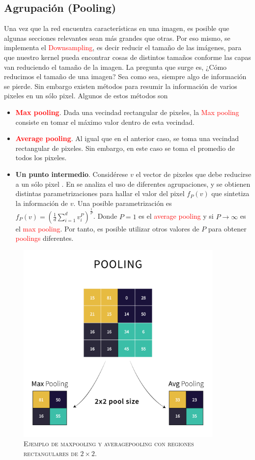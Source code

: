 \subsection{Agrupación (Pooling)}
Una vez que la red encuentra características en una imagen, es posible que algunas secciones relevantes sean más grandes que otras. Por eso mismo, se implementa el \textcolor{red}{Downsampling}, es decir reducir el tamaño de las imágenes, para que nuestro kernel pueda encontrar cosas de distintos tamaños conforme las capas van reduciendo el tamaño de la imagen. La pregunta que surge es, ¿Cómo reducimos el tamaño de una imagen?  Sea como sea, siempre algo de información se pierde. Sin embargo existen métodos para resumir la información de varios pixeles en un sólo pixel. Algunos de estos métodos son
\begin{itemize}
    \item \textcolor{red}{\textbf{Max pooling}}. Dada una vecindad rectangular de pixeles, la \textcolor{red}{Max pooling} consiste en tomar el máximo valor dentro de esta vecindad. 
    \item \textcolor{red}{\textbf{Average pooling}}. Al igual que en el anterior caso, se toma una vecindad rectangular de pixeles. Sin embargo, en este caso se toma el promedio de todos los pixeles.
    \item \textbf{Un punto intermedio}. Considérese $v$ el vector de pixeles que debe reducirse a un sólo pixel . En \cite{pooling_analysis} se analiza el uso de diferentes agrupaciones, y se obtienen distintas parametrizaciones para hallar el valor del pixel $f_P(v)$ que sintetiza la información de $v$. Una posible parametrización es $f_P(v) = \left(\frac{1}{d}\sum_{i= 1}^{d}v_i^P\right)^{\frac{1}{P}}$. Donde $P=1$ es el \textcolor{red}{average pooling} y si $P\to \infty$ es el \textcolor{red}{max pooling}. Por tanto, es posible utilizar otros valores de $P$ para obtener \textcolor{red}{poolings} diferentes.
\end{itemize} 
\begin{figure}[H]
    \centering
    \includegraphics[width=4in]{../cap2_CNNs/src/pooling.png}
    \caption{\textsc{Ejemplo de maxpooling y averagepooling con regiones rectangulares de $2\times 2$.}} 
\end{figure}

